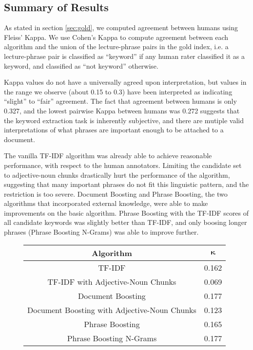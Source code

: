 \subsection{Summary of Results}
\label{sec:sum}


As stated in section \ref{sec:gold}, we computed agreement between humans using Fleiss' Kappa. We use Cohen's Kappa to compute agreement between each algorithm and the union of the lecture-phrase pairs in the gold index, i.e. a lecture-phrase pair is classified as ``keyword'' if any human rater classified it as a keyword, and classified as ``not keyword'' otherwise. 

Kappa values do not have a universally agreed upon interpretation, but values in the range we observe (about 0.15 to 0.3) have been interpreted as indicating ``slight'' to ``fair'' agreement. The fact that agreement between humans is only 0.327, and the lowest pairwise Kappa between humans was 0.272 suggests that the keyword extraction task is inherently subjective, and there are mutiple valid interpretations of what phrases are important enough to be attached to a document.

The vanilla TF-IDF algorithm was already able to achieve reasonable performance, with respect to the human annotators. Limiting the candidate set to adjective-noun chunks drastically hurt the performance of the algorithm, suggesting that many important phrases do not fit this linguistic pattern, and the restriction is too severe. Document Boosting and Phrase Boosting, the two algorithms that incorporated external knowledge, were able to make improvements on the basic algorithm. Phrase Boosting with the TF-IDF scores of all candidate keywords was slightly better than TF-IDF, and only boosing longer phrases (Phrase Boosting N-Grams) was able to improve further.

\begin{figure}
\caption{}
\label{fig:main_result}
\begin{tabular}{|c|c|}
\hline
\textbf{Algorithm} & $\mathbf{\kappa}$ \\
\hline 
TF-IDF & 0.162 \\
\hline 
TF-IDF with Adjective-Noun Chunks & 0.069 \\
\hline
Document Boosting & 0.177 \\
\hline
Document Boosting with Adjective-Noun Chunks & 0.123 \\
\hline 
Phrase Boosting & 0.165 \\
\hline
Phrase Boosting N-Grams & 0.177 \\
\hline
\end{tabular}
\end{figure}